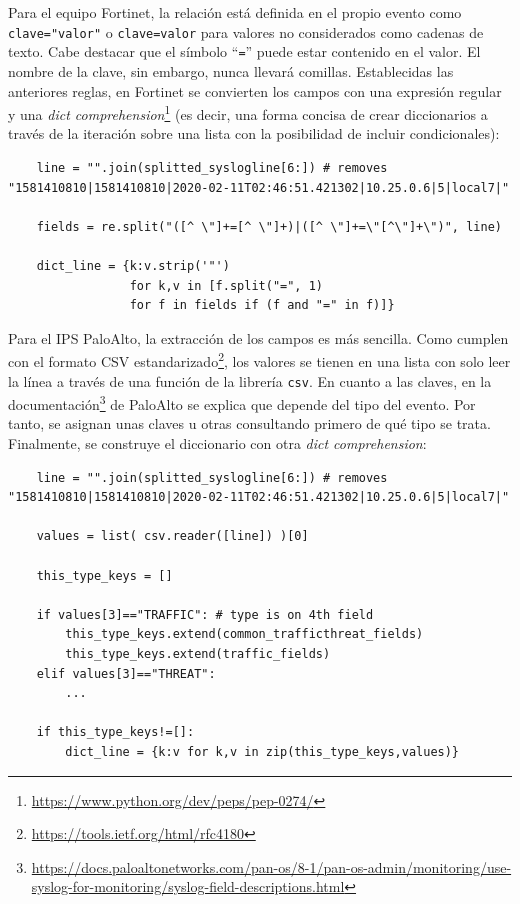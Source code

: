 Para el equipo Fortinet, la relación está definida en el propio evento como \texttt{clave="valor"} o \texttt{clave=valor} para valores no considerados como cadenas de texto.
Cabe destacar que el símbolo ``\texttt{=}'' puede estar contenido en el valor.
El nombre de la clave, sin embargo, nunca llevará comillas.
Establecidas las anteriores reglas, en Fortinet se convierten los campos con una expresión regular y una \emph{dict comprehension}\footnote{\url{https://www.python.org/dev/peps/pep-0274/}}
(es decir, una forma concisa de crear diccionarios a través de la iteración sobre una lista con la posibilidad de incluir condicionales):

\begin{verbatim}
    line = "".join(splitted_syslogline[6:]) # removes "1581410810|1581410810|2020-02-11T02:46:51.421302|10.25.0.6|5|local7|"

    fields = re.split("([^ \"]+=[^ \"]+)|([^ \"]+=\"[^\"]+\")", line)

    dict_line = {k:v.strip('"')
                 for k,v in [f.split("=", 1)
                 for f in fields if (f and "=" in f)]}
\end{verbatim}

Para el IPS PaloAlto, la extracción de los campos es más sencilla.
Como cumplen con el formato CSV estandarizado\footnote{\url{https://tools.ietf.org/html/rfc4180}}, los valores se tienen en una lista
con solo leer la línea a través de una función de la librería \texttt{csv}.
En cuanto a las claves, en la documentación\footnote{\url{https://docs.paloaltonetworks.com/pan-os/8-1/pan-os-admin/monitoring/use-syslog-for-monitoring/syslog-field-descriptions.html}}
de PaloAlto se explica que depende del tipo del evento.
Por tanto, se asignan unas claves u otras consultando primero de qué tipo se trata.
Finalmente, se construye el diccionario con otra \emph{dict comprehension}:

\begin{verbatim}
    line = "".join(splitted_syslogline[6:]) # removes "1581410810|1581410810|2020-02-11T02:46:51.421302|10.25.0.6|5|local7|"

    values = list( csv.reader([line]) )[0]

    this_type_keys = []

    if values[3]=="TRAFFIC": # type is on 4th field
        this_type_keys.extend(common_trafficthreat_fields)
        this_type_keys.extend(traffic_fields)
    elif values[3]=="THREAT":
        ...

    if this_type_keys!=[]:
        dict_line = {k:v for k,v in zip(this_type_keys,values)}
\end{verbatim}

